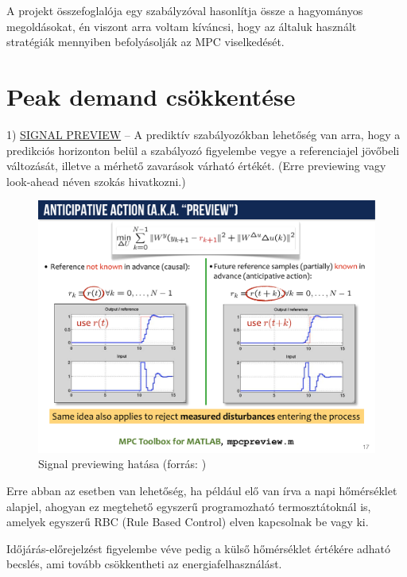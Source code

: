 A projekt összefoglalója egy szabályzóval hasonlítja össze a hagyományos megoldásokat, én viszont arra voltam kíváncsi, hogy az általuk használt stratégiák mennyiben befolyásolják az MPC viselkedését.



\section{Peak demand csökkentése}

{\large 1) \underline{SIGNAL PREVIEW} -- }A prediktív szabályozókban lehetőség van arra, hogy a predikciós horizonton belül a szabályozó figyelembe vegye a referenciajel jövőbeli változását, illetve a mérhető zavarások várható értékét. (Erre previewing vagy look-ahead néven szokás hivatkozni.)


\begin{figure}[H]
	\centering
	\includegraphics[trim=10 50 10 0, clip,width=\textwidth]{figures/onlab/preview}
	\caption{Signal previewing hatása (forrás: \cite{BemporadLecture1})}
	\label{fig:preview-bemporad}
\end{figure}

Erre abban az esetben van lehetőség, ha például elő van írva a napi hőmérséklet alapjel, ahogyan ez megtehető egyszerű programozható termosztátoknál is, amelyek egyszerű RBC (Rule Based Control) elven kapcsolnak be vagy ki.

Időjárás-előrejelzést figyelembe véve pedig a külső hőmérséklet értékére adható becslés, ami tovább csökkentheti az energiafelhasználást.

